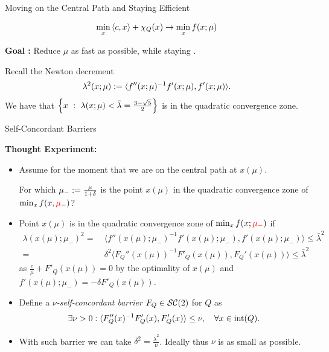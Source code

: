 \documentclass[9pt]{beamer}
\begin{document}
\begin{frame}{Moving on the Central Path and Staying Efficient}

  \begin{center}
    \begin{tcolorbox}[width=0.7\textwidth]
      \[
        \min_x \left<c, x\right> + \chi_Q(x) \to \min_x f(x; \mu)
      \]
    \end{tcolorbox}
  \end{center}

  \vfill

  \textbf{Goal :} Reduce $\mu$ as fast as possible, while staying . 

  \vfill
  Recall the Newton decrement
  \[
    \lambda^2(x; \mu) := \langle f''(x;\mu)^{-1} f'(x;\mu), f'(x; \mu) \rangle.
  \]
  We have that $\left\{ x\ : \ \lambda(x; \mu)<\bar \lambda=\frac{3-\sqrt 5}{2} \right\}$ is in the quadratic convergence zone.
  
\end{frame}

\begin{frame}{Self-Concordant Barriers}

  \textbf{Thought Experiment:}
  \begin{itemize}
  \item Assume for the moment that we are on the central path at $x(\mu)$. \\
    \begin{tcolorbox}
      For which $\mu_{-} := \frac{\mu}{1+\delta}$ is the point $x(\mu)$ in the quadratic convergence zone of $\min_x f(x, {\color{red} \mu_{-}})$?
    \end{tcolorbox}

  \item<2-> Point $x(\mu)$ is in the quadratic convergence zone of $\min_x f(x; {\color{red} \mu_{-}})$ if
    \begin{align*}
      \lambda(x(\mu); \mu_{-})^2 = & ~\langle f''(x(\mu); \mu_{-})^{-1} f'(x(\mu); \mu_{-}), f'(x(\mu); \mu_{-}) \rangle \leq \bar \lambda^2\\
      = & ~\delta^2 \langle F_Q''(x(\mu))^{-1} F'_Q(x(\mu)), F_Q'(x(\mu)) \rangle \leq \bar \lambda^2
    \end{align*}
    as $\frac{c}{\mu} + F'_Q(x(\mu))=0$ by the optimality of $x(\mu)$ and $f'(x(\mu); \mu_{-}) = -\delta F'_Q(x(\mu))$.
  \item<3->  Define a \emph{$\nu$-self-concordant barrier} $F_Q\in\mathcal{SC}(2)$ for $Q$ as 
    \[
      \exists \nu>0 : \langle F_Q''(x)^{-1} F'_Q(x), F_Q'(x)\rangle \leq \nu, \quad \forall x\in \operatorname{int}(Q).
    \]
  \item<3->  With such barrier we can take $\delta^2 = \frac{\bar \lambda^2}{\nu}$. Ideally thus $\nu$ is as small as possible.
  \end{itemize}
  
\end{frame}
\end{document}
